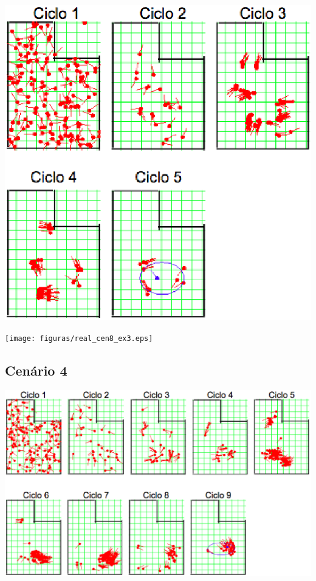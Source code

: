 {\centering
\includegraphics[scale=0.4]{figuras/cen8_ex3.eps}
\label{img:cen8_ex3}
\par}

{\centering
\texttt{[image: figuras/real\_cen8\_ex3.eps]}
\label{img:real_cen8_ex3}
\par}

\subsection{Cenário 4}

{\centering
\includegraphics[scale=0.4]{figuras/cen8_ex4.eps}
\label{img:cen8_ex4}
\par}

